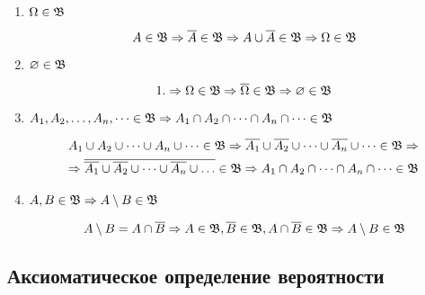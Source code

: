 \begin{enumerate}
	\item $\Omega \in \mathfrak{B}$
	\begin{Proof}
		\[
			A \in \mathfrak{B} \Rightarrow \overline{A} \in \mathfrak{B} \Rightarrow A \cup \overline{A} \in \mathfrak{B} \Rightarrow \Omega \in \mathfrak{B}
		\]
	\end{Proof}
	
	\item $\varnothing \in \mathfrak{B}$
	\begin{Proof}
		\[
			1. \Rightarrow \Omega \in \mathfrak{B} \Rightarrow \overline{\Omega} \in \mathfrak{B} \Rightarrow \varnothing \in \mathfrak{B}
		\]
	\end{Proof}
	
	\item $A_1, A_2, \dots, A_n, \dots \in \mathfrak{B} \Rightarrow A_1 \cap A_2 \cap \dots \cap A_n \cap \dots \in \mathfrak{B}$
	\begin{Proof}
		\begin{multline*}
			A_1 \cup A_2 \cup \dots \cup A_n \cup \dots \in \mathfrak{B} \Rightarrow \overline{A_1} \cup \overline{A_2} \cup \dots \cup \overline{A_n} \cup \dots \in \mathfrak{B} \Rightarrow \\
			\Rightarrow \overline{\overline{A_1} \cup \overline{A_2} \cup \dots \cup \overline{A_n} \cup \dots} \in \mathfrak{B} \Rightarrow A_1 \cap A_2 \cap \dots \cap A_n \cap \dots \in \mathfrak{B}
		\end{multline*}
	\end{Proof}
	
	\item $A, B \in \mathfrak{B} \Rightarrow A \setminus B \in \mathfrak{B}$
	\begin{Proof}
		\[
			A \setminus B = A \cap \overline{B} \Rightarrow A \in \mathfrak{B}, \overline{B} \in \mathfrak{B}, A \cap \overline{B} \in \mathfrak{B} \Rightarrow A \setminus B \in \mathfrak{B}
		\]
	\end{Proof}
\end{enumerate}



\subsection{Аксиоматическое определение вероятности}

